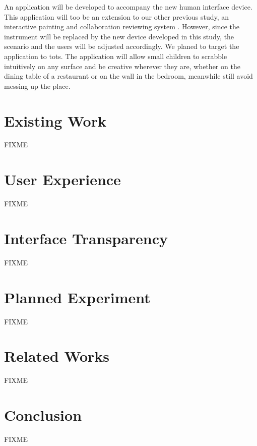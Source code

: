 \documentclass{acm_proc_article-sp}
\begin{document}
An application will be developed to accompany the new human interface
device. This application will too be an extension to our other
previous study, an interactive painting and collaboration reviewing
system \citep{baba:abeyrathne}. However, since the instrument will be
replaced by the new device developed in this study, the scenario and
the users will be adjusted accordingly. We planed to target the
application to tots. The application will allow small children to
scrabble intuitively on any surface and be creative wherever they are,
whether on the dining table of a restaurant or on the wall in the
bedroom, meanwhile still avoid messing up the place.



\section{Existing Work}
FIXME


\section{User Experience}
FIXME


\section{Interface Transparency}
FIXME



\section{Planned Experiment}
FIXME


\section{Related Works}
FIXME


\section{Conclusion}
FIXME




\end{document}
